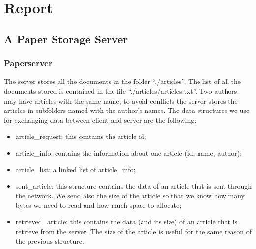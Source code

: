 





\maketitle

%
%
%
%
%


\section{Report}
\subsection{A Paper Storage Server}
\subsubsection{Paperserver}
The server stores all the documents in the folder ``./articles''. The list of all the documents stored is contained in the file ``./articles/articles.txt''. Two authors may have articles with the same name, to avoid conflicts the server stores the articles in subfolders named with the author's names.
The data structures we use for exchanging data between client and server are the following:
\begin{itemize}
\item article\_request: this contains the article id;
\item article\_info: contains the information about one article (id, name, author);
\item article\_list: a linked list of article\_info;
\item sent\_article: this structure contains the data of an article that is sent through the network. We send also the size of the article so that we know how many bytes we need to read and how much space to allocate;
\item retrieved\_article: this contains the data (and its size) of an article that is retrieve from the server. The size of the article is useful for the same reason of the previous structure.
\end{itemize}


